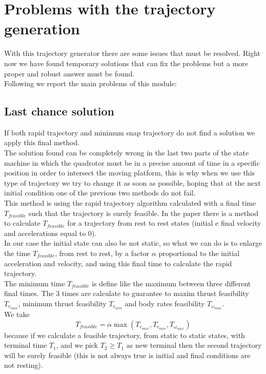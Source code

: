 \section{Problems with the trajectory generation} \label{sec:trajectory_problem}
With this trajectory generator there are some issues that must be resolved. Right now we have found temporary solutions that can fix the problems but a more proper and robust answer must be found.\\
Following we report the main problems of this module:
\subsection{Last chance solution}
If both rapid trajectory and minimum snap trajectory do not find a solution we apply this final method.\\
The solution found can be completely wrong in the last two parts of the state machine in which the quadrotor must be in a precise amount of time in a specific position in order to intersect the moving platform, this is why when we use this type of trajectory we try to change it as soon as possible, hoping that at the next initial condition one of the previous two methods do not fail.\\

This method is using the rapid trajectory algorithm calculated with a final time $T_{feasible}$ such that the trajectory is surely feasible. In the paper \cite{mueller2015computationally} there is a method to calculate $T_{feasible}$ for a trajectory from rest to rest states (initial e final velocity and accelerations equal to 0).\\
In our case the initial state can also be not static, so what we can do is to enlarge the time $T_{feasible}$, from rest to rest, by a factor $\alpha$ proportional to the initial acceleration and velocity, and using this final time to calculate the rapid trajectory.\\

The minimum time $T_{feasible}$ is define like the maximum between three different final times. The 3 times are calculate to guarantee to maxim thrust feasibility $T_{c_{max}}$, minimum thrust feasibility $T_{c_{min}}$ and body rates feasibility $T_{\omega_{max}}$. \\
We take $$T_{feasible} = \alpha \max{(T_{c_{max}},T_{c_{min}},T_{\omega_{max}})}$$  because
if  we calculate a feasible trajectory, from static to static states, with terminal time $T_1$, and we pick $T_2 \geq T_1$ as new terminal then the second trajectory will be surely feasible (this is not always true is initial and final conditions are not resting).\\

